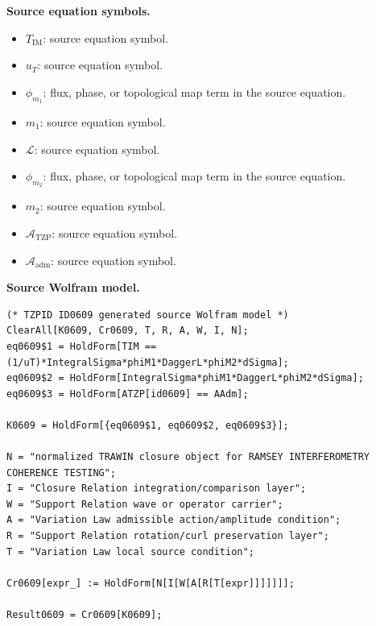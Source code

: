 \begin{minipage}[t]{0.49\linewidth}
\begingroup
\small
\raggedright
\textbf{Source equation symbols.}\par
\begin{itemize}[leftmargin=1.35em,itemsep=1pt,topsep=1pt,parsep=0pt]
    \item $T_{\mathrm{IM}}$: source equation symbol.
    \item $u_T$: source equation symbol.
    \item $\phi_{m_1}$: flux, phase, or topological map term in the source equation.
    \item $m_1$: source equation symbol.
    \item $\mathcal{L}$: source equation symbol.
    \item $\phi_{m_2}$: flux, phase, or topological map term in the source equation.
    \item $m_2$: source equation symbol.
    \item $\mathcal{A}_{\mathrm{TZP}}$: source equation symbol.
    \item $\mathcal{A}_{\mathrm{adm}}$: source equation symbol.
\end{itemize}
\endgroup
\end{minipage}\hfill
\begin{minipage}[t]{0.47\linewidth}
\begingroup
\scriptsize
\raggedright
\textbf{Source Wolfram model.}\par
\begin{Verbatim}[fontsize=\tiny,breaklines=true,breakanywhere=true]
(* TZPID ID0609 generated source Wolfram model *)
ClearAll[K0609, Cr0609, T, R, A, W, I, N];
eq0609$1 = HoldForm[TIM == (1/uT)*IntegralSigma*phiM1*DaggerL*phiM2*dSigma];
eq0609$2 = HoldForm[IntegralSigma*phiM1*DaggerL*phiM2*dSigma];
eq0609$3 = HoldForm[ATZP[id0609] == AAdm];

K0609 = HoldForm[{eq0609$1, eq0609$2, eq0609$3}];

N = "normalized TRAWIN closure object for RAMSEY INTERFEROMETRY COHERENCE TESTING";
I = "Closure Relation integration/comparison layer";
W = "Support Relation wave or operator carrier";
A = "Variation Law admissible action/amplitude condition";
R = "Support Relation rotation/curl preservation layer";
T = "Variation Law local source condition";

Cr0609[expr_] := HoldForm[N[I[W[A[R[T[expr]]]]]]];

Result0609 = Cr0609[K0609];
\end{Verbatim}
\endgroup
\end{minipage}


